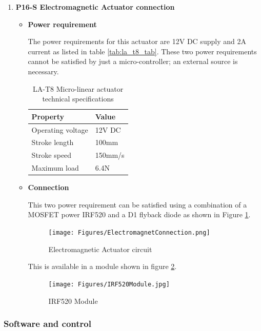 \begin{enumerate}
    \item \textbf{P16-S Electromagnetic Actuator connection}
    \par
    \begin{itemize}
        \item \textbf{Power requirement}
        \par
        The power requirements for this actuator are 12V DC supply and 2A current as listed in table \ref{tab:la_t8_tab}. These two power requirements cannot be satisfied by just a micro-controller; an external source is necessary.
        \begin{table}[H]
    \centering
       \caption[LA-T8 Micro-linear actuator technical specifications]{LA-T8 Micro-linear actuator technical specifications \cite{la_t8}}
    \begin{tabular}{|l|l|}
    \hline
    \textbf{Property} & \textbf{Value} \\ \hline
    Operating voltage & 12V DC \\ \hline
    Stroke length & 100mm \\ \hline
    Stroke speed & 150mm/s \\ \hline
    Maximum load & 6.4N \\ \hline
    \end{tabular}
    \end{table}
        \item \textbf{Connection}
        \par
        This two power requirement can be satisfied using a combination of a MOSFET power IRF520 and a D1 flyback diode as shown in Figure \ref{fig:electromagnet_connection}.
        \begin{figure}[H]
            \centering
            \texttt{[image: Figures/ElectromagnetConnection.png]}
            \caption{Electromagnetic Actuator circuit}
            \label{fig:electromagnet_connection}
        \end{figure}
        This is available in a module shown in figure \ref{fig:irf520_module}.
        \begin{figure}[H]
            \centering
            \texttt{[image: Figures/IRF520Module.jpg]}
            \caption[IRF520 Module]{IRF520 Module \cite{irf520}}
            \label{fig:irf520_module}
        \end{figure}
    \end{itemize}
\end{enumerate}
\subsubsection{Software and control}


